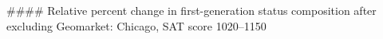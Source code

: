 #### Relative percent change in first-generation status composition after excluding Geomarket: Chicago, SAT score 1020–1150
